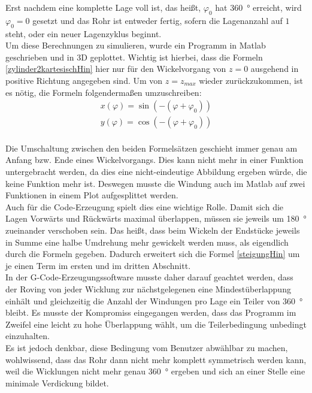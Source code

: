 \documentclass[12pt, a4paper, ngerman]{article}
\begin{document}
Erst nachdem eine komplette Lage voll ist, das heißt, $\varphi_0$ hat \SI{360}{\degree} erreicht, wird $\varphi_0 = 0$ gesetzt und das Rohr ist entweder fertig, sofern die Lagenanzahl auf $1$ steht, oder ein neuer Lagenzyklus beginnt.\\
Um diese Berechnungen zu simulieren, wurde ein Programm in Matlab geschrieben und in 3D geplottet. Wichtig ist hierbei, dass die Formeln \eqref{zylinder2kartesischHin} hier nur für den Wickelvorgang von $z = 0$ ausgehend in positive Richtung angegeben sind. Um von $z = z_{max}$ wieder zurückzukommen, ist es nötig, die Formeln folgendermaßen umzuschreiben:\\
\begin{eqnarray}\label{zylinder2kartesischRück}
	x(\varphi) = \sin(-(\varphi + \varphi_0))\\
	y(\varphi) = \cos(-(\varphi + \varphi_0))
\end{eqnarray}\\
Die Umschaltung zwischen den beiden Formelsätzen geschieht immer genau am Anfang bzw. Ende eines Wickelvorgangs. Dies kann nicht mehr in einer Funktion untergebracht werden, da dies eine nicht-eindeutige Abbildung ergeben würde, die keine Funktion mehr ist. Deswegen musste die Windung auch im Matlab auf zwei Funktionen in einem Plot aufgesplittet werden. \\
Auch für die Code-Erzeugung spielt dies eine wichtige Rolle. Damit sich die Lagen Vorwärts und Rückwärts maximal überlappen, müssen sie jeweils um \SI{180}{\degree} zueinander verschoben sein. Das heißt, dass beim Wickeln der Endstücke jeweils in Summe eine halbe Umdrehung mehr gewickelt werden muss, als eigendlich durch die Formeln gegeben. Dadurch erweitert sich die Formel \eqref{steigungHin} um je einen Term im ersten und im dritten Abschnitt.\\
In der G-Code-Erzeugungssoftware musste daher darauf geachtet werden, dass der Roving von jeder Wicklung zur nächstgelegenen eine Mindestüberlappung einhält und gleichzeitig die Anzahl der Windungen pro Lage ein Teiler von \SI{360}{\degree} bleibt. Es musste der Kompromiss eingegangen werden, dass das Programm im Zweifel eine leicht zu hohe Überlappung wählt, um die Teilerbedingung unbedingt einzuhalten.\\
Es ist jedoch denkbar, diese Bedingung vom Benutzer abwählbar zu machen, wohlwissend, dass das Rohr dann nicht mehr komplett symmetrisch werden kann, weil die Wicklungen nicht mehr genau \SI{360}{\degree} ergeben und sich an einer Stelle eine minimale Verdickung bildet.\\
\end{document}
